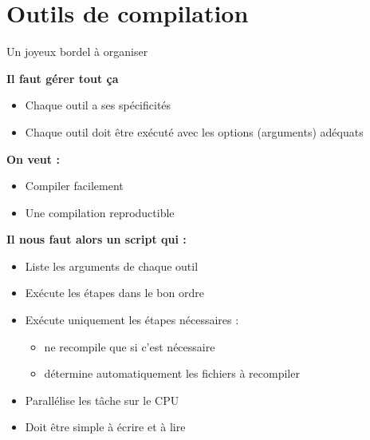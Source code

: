 
\section{Outils de compilation}

\begin{frame}{Un joyeux bordel à organiser}

  \textbf{\large Il faut gérer tout ça}
  \par
  \begin{itemize}
    \item Chaque outil a ses spécificités
    \item Chaque outil doit être exécuté avec les options (arguments) adéquats
  \end{itemize}
  \bigskip
  \textbf{\large On veut :}
  \begin{itemize}
    \item Compiler facilement
    \item Une compilation reproductible
  \end{itemize}
  \bigskip
  \textbf{\large Il nous faut alors un script qui :}
  \begin{itemize}
    \item Liste les arguments de chaque outil
    \item Exécute les étapes dans le bon ordre
    \item Exécute uniquement les étapes nécessaires :
      \begin{itemize}
        \item ne recompile que si c'est nécessaire
        \item détermine automatiquement les fichiers à recompiler
      \end{itemize}
    \item Parallélise les tâche sur le CPU
    \item Doit être simple à écrire et à lire
  \end{itemize}

\end{frame}

